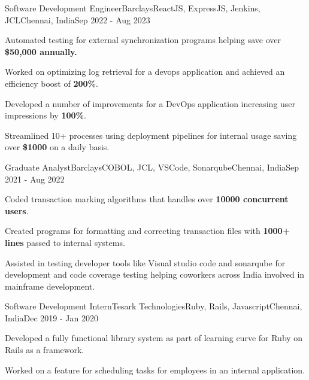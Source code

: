 \documentclass[letterpaper]{resume_config}
\begin{document}
\WorkExperience
    {Software Development Engineer}{Barclays}{ReactJS, ExpressJS, Jenkins, JCL}{Chennai, India}{Sep 2022 - Aug 2023}
    {
        \item{Automated testing for external synchronization programs helping save over \textbf{\$50,000 annually.}}
        \item {Worked on optimizing log retrieval for a devops application and achieved an efficiency boost of \textbf{200\%}.}
        \item {Developed a number of improvements for a DevOps application increasing user impressions by \textbf{100\%}.} 
        \item {Streamlined 10+ processes using deployment pipelines for internal usage saving over \textbf{\$1000} on a daily basis.}
    }
\WorkExperience
    {Graduate Analyst}{Barclays}{COBOL, JCL, VSCode, Sonarqube}{Chennai, India}{Sep 2021 - Aug 2022}
    {
        \item {Coded transaction marking algorithms that handles over \textbf{10000 concurrent users}.}
        \item {Created programs for formatting and correcting transaction files with \textbf{1000+ lines} passed to internal systems.}
        \item {Assisted in testing developer tools like Visual studio code and sonarqube for development and code coverage testing helping coworkers across India involved in mainframe development.}
    }
\WorkExperience
    {Software Development Intern}{Tesark Technologies}{Ruby, Rails, Javascript}{Chennai, India}{Dec 2019 - Jan 2020}
    {
        \item {Developed a fully functional library system as part of learning curve for Ruby on Rails as a framework.}
        \item {Worked on a feature for scheduling tasks for employees in an internal application.}
    }

\vspace{-8pt}

\end{document}
